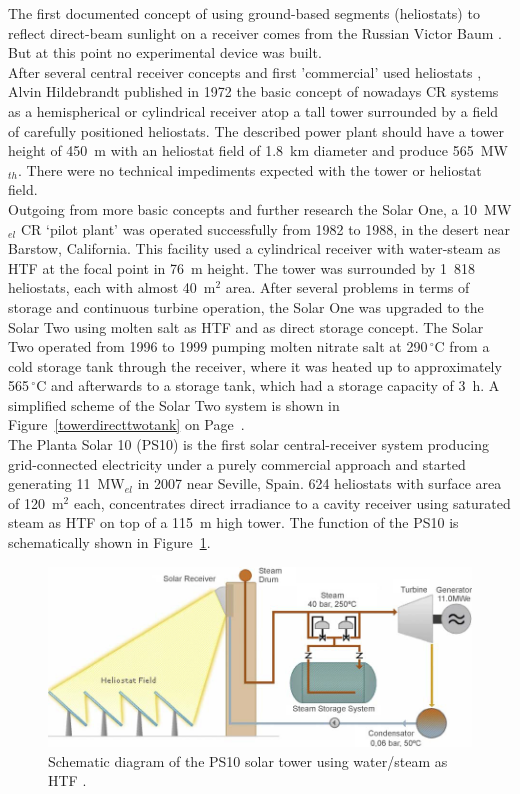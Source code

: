 \documentclass[Master,MEE,english]{twbook}%
\begin{document}
The first documented concept of using ground-based segments (heliostats) to reflect direct-beam sunlight on a receiver comes from the Russian Victor Baum \cite{Baum1957}. But at this point no experimental device was built.\\
After several central receiver concepts and first 'commercial' used heliostats \cite{Trombe1957}, Alvin Hildebrandt published in 1972 the basic concept of nowadays CR systems as a hemispherical or cylindrical receiver atop a tall tower surrounded by a field of carefully positioned heliostats. The described power plant should have a tower height of 450~m with an heliostat field of 1.8~km diameter and produce 565~MW$_{th}$. There were no technical impediments expected with the tower or heliostat field. \cite{Hildebrandt1972}\\
Outgoing from more basic concepts and further research the Solar One, a 10~MW$_{el}$ CR ‘pilot plant’ was operated successfully from 1982 to 1988, in the desert near Barstow, California. This facility used a cylindrical receiver with water-steam as HTF at the focal point in 76~m height. The tower was surrounded by 1~818 heliostats, each with almost 40~m$^2$ area. After several problems in terms of storage and continuous turbine operation, the Solar One was upgraded to the Solar Two using molten salt as HTF and as direct storage concept. The Solar Two operated from 1996 to 1999 pumping molten nitrate salt at 290$\,^{\circ}\mathrm{C}$ from a cold storage tank through the receiver, where it was heated up to approximately 565$\,^{\circ}\mathrm{C}$ and afterwards to a storage tank, which had a storage capacity of 3~h. A simplified scheme of the Solar Two system is shown in Figure~\ref{towerdirecttwotank} on Page~\pageref{towerdirecttwotank}. \cite{Reilly2001}\\
The Planta Solar 10 (PS10) is the first solar central-receiver system producing grid-connected electricity under a purely commercial approach and started generating 11~MW$_{el}$ in 2007 near Seville, Spain. 624 heliostats with surface area of 120~m$^2$ each, concentrates direct irradiance to a cavity receiver using saturated steam as HTF on top of a 115~m high tower. The function of the PS10 is schematically shown in Figure~\ref{directsteamgeneration}.
\begin{figure}[!h] 
\centering
\includegraphics[width=0.7\linewidth]{FIG/directsteamgeneration}
\caption[Schematic diagram of the PS10 solar tower using water/steam as HTF.]{Schematic diagram of the PS10 solar tower using water/steam as HTF \cite{Medrano2010}.}\label{directsteamgeneration}
\end{figure}
\end{document}
